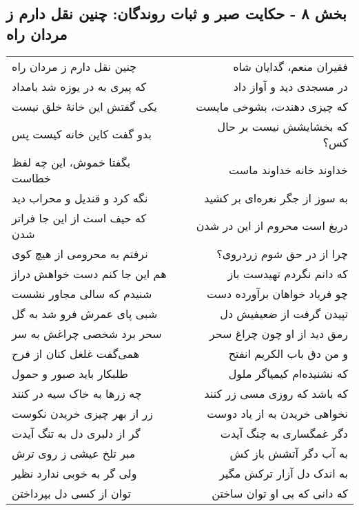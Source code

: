 \begin{center}
\section*{بخش ۸ - حکایت صبر و ثبات روندگان: چنین نقل دارم ز مردان راه}
\label{sec:008}
\begin{longtable}{l p{0.5cm} r}
چنین نقل دارم ز مردان راه
&&
فقیران منعم، گدایان شاه
\\
که پیری به در یوزه شد بامداد
&&
در مسجدی دید و آواز داد
\\
یکی گفتش این خانهٔ خلق نیست
&&
که چیزی دهندت، بشوخی مایست
\\
بدو گفت کاین خانه کیست پس
&&
که بخشایشش نیست بر حال کس؟
\\
بگفتا خموش، این چه لفظ خطاست
&&
خداوند خانه خداوند ماست
\\
نگه کرد و قندیل و محراب دید
&&
به سوز از جگر نعره‌ای بر کشید
\\
که حیف است از این جا فراتر شدن
&&
دریغ است محروم از این در شدن
\\
نرفتم به محرومی از هیچ کوی
&&
چرا از در حق شوم زردروی؟
\\
هم این جا کنم دست خواهش دراز
&&
که دانم نگردم تهیدست باز
\\
شنیدم که سالی مجاور نشست
&&
چو فریاد خواهان برآورده دست
\\
شبی پای عمرش فرو شد به گل
&&
تپیدن گرفت از ضعیفیش دل
\\
سحر برد شخصی چراغش به سر
&&
رمق دید از او چون چراغ سحر
\\
همی‌گفت غلغل کنان از فرح
&&
و من دق باب الکریم انفتح
\\
طلبکار باید صبور و حمول
&&
که نشنیده‌ام کیمیاگر ملول
\\
چه زرها به خاک سیه در کنند
&&
که باشد که روزی مسی زر کنند
\\
زر از بهر چیزی خریدن نکوست
&&
نخواهی خریدن به از یاد دوست
\\
گر از دلبری دل به تنگ آیدت
&&
دگر غمگساری به چنگ آیدت
\\
مبر تلخ عیشی ز روی ترش
&&
به آب دگر آتشش باز کش
\\
ولی گر به خوبی ندارد نظیر
&&
به اندک دل آزار ترکش مگیر
\\
توان از کسی دل بپرداختن
&&
که دانی که بی او توان ساختن
\\
\end{longtable}
\end{center}
